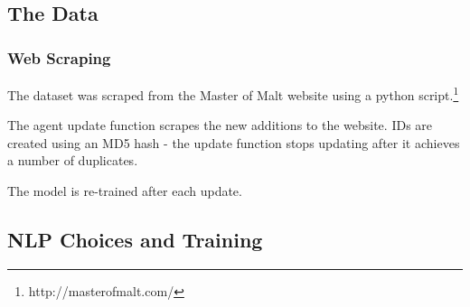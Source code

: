 \documentclass{beamer}
\begin{document}
\subsection{The Data}
\begin{frame}
    \frametitle{Web Scraping}
    The dataset was scraped from the Master of Malt website using a python 
script.\footnote{http://masterofmalt.com/}

The agent update function scrapes the new additions to the website. 
IDs are created using an MD5 hash - the update function stops updating 
after it achieves a number of duplicates.

The model is re-trained after each update.
\end{frame}

\subsection{NLP Choices and Training}
\end{document}
